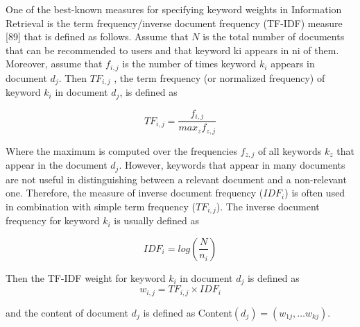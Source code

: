 One of the best-known measures for specifying keyword weights in Information Retrieval is the term frequency/inverse document frequency (TF-IDF) measure [89] that is defined as follows. Assume that $N$ is the total number of documents that can be recommended to users and that keyword ki appears in ni of them. Moreover, assume that $f_{i,j}$  is the number of times keyword $k_i$ appears in document $d_j$. Then $TF_{i,j}$ , the term frequency (or normalized frequency) of keyword $k_i$ in document $d_j$, is defined as

\begin{equation} \label{eq:2}
TF_{i,j} = \frac{f_{i,j}}{max_z f_{z,j}}
\end{equation}

Where the maximum is computed over the frequencies $f_{z,j}$ of all keywords $k_z$ that appear in the document $d_j$. However, keywords that appear in many documents are not useful in distinguishing between a relevant document and a non-relevant one. Therefore, the 
measure of inverse document frequency ($IDF_i$) is often used in combination with simple term frequency ($TF_{i, j}$). The inverse document frequency for keyword $k_i$ is usually defined as

\begin{equation} \label{eq:3}
IDF_i = log(\frac{N}{n_i})
\end{equation}

Then the TF-IDF weight for keyword $k_i$ in document $d_j$ is defined as
\begin{equation} \label{eq:4}
w_{i,j} = TF_{i,j} \times IDF_{i}
\end{equation}

and the content of document $d_j$ is defined as Content$(d_j) = (w_{1j}, w_{kj})$.



